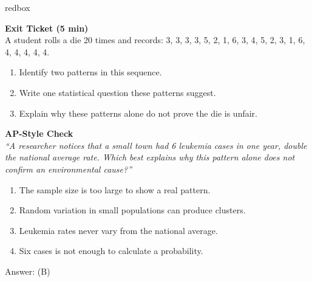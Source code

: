 \documentclass[10pt]{article}
\begin{document}
\begin{skillbox}{redbox}
\begin{minipage}[t]{0.48\linewidth}
    \textbf{Exit Ticket (5 min)}\\
    A student rolls a die 20 times and records: 3, 3, 3, 3, 5, 2, 1, 6, 3, 4,
    5, 2, 3, 1, 6, 4, 4, 4, 4, 4.
    \begin{enumerate}
        \item Identify two patterns in this sequence.
        \item Write one statistical question these patterns suggest.
        \item Explain why these patterns alone do not prove the die is unfair.
    \end{enumerate}
\end{minipage}
\hfill
\begin{minipage}[t]{0.48\linewidth}
    \textbf{AP-Style Check}\\
    \textit{``A researcher notices that a small town had 6 leukemia cases in one year,
    double the national average rate. Which best explains why this pattern alone does
    not confirm an environmental cause?''}
    \begin{enumerate}[label=(\Alph*)]
        \item The sample size is too large to show a real pattern.
        \item Random variation in small populations can produce clusters.
        \item Leukemia rates never vary from the national average.
        \item Six cases is not enough to calculate a probability.
    \end{enumerate}
    Answer: (B)
\end{minipage}
\end{skillbox}
\end{document}
